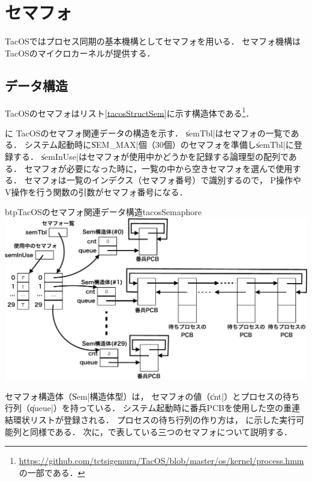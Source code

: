 \chapter{セマフォ}
\label{tacosImpSemaphore}
TacOSではプロセス同期の基本機構としてセマフォを用いる．
セマフォ機構はTacOSのマイクロカーネルが提供する．

\section{データ構造}
TacOSのセマフォはリスト\ref{tacosStructSem}に示す構造体である\footnote{
  \url{https://github.com/tctsigemura/TacOS/blob/master/os/kernel/process.hmm}
  の一部である．}．



に
TacOSのセマフォ関連データの構造を示す．
\|semTbl|はセマフォの一覧である．
システム起動時に\|SEM_MAX|個（30個）のセマフォを準備し\|semTbl|に登録する．
\|semInUse|はセマフォが使用中かどうかを記録する論理型の配列である．
セマフォが必要になった時に，一覧の中から空きセマフォを選んで使用する．
セマフォは一覧のインデクス（セマフォ番号）で識別するので，
P操作やV操作を行う関数の引数がセマフォ番号になる．

\begin{myfig}{btp}{TacOSのセマフォ関連データ構造}{tacosSemaphore}
  \includegraphics[scale=0.6]{Fig/tacosSemaphore-crop.pdf}
\end{myfig}

セマフォ構造体（\|Sem|構造体型）は，
セマフォの値（\|cnt|）とプロセスの待ち行列（\|queue|）を持っている．
システム起動時に番兵PCBを使用した空の重連結環状リストが登録される．
プロセスの待ち行列の作り方は，
に示した実行可能列と同様である．
次に，で表している三つのセマフォについて説明する．

